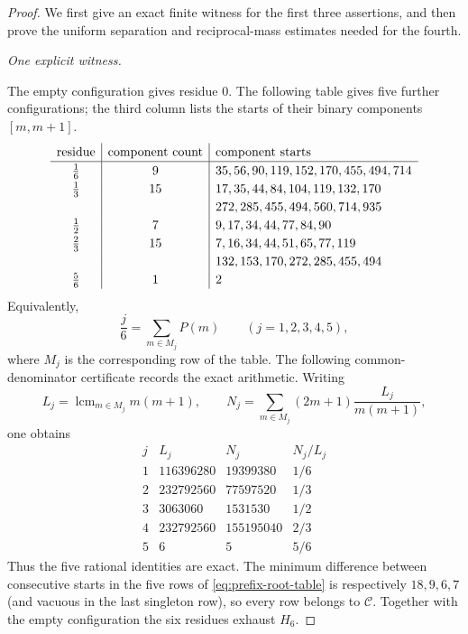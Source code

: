 \begin{proof}
We first give an exact finite witness for the first three assertions, and then prove the uniform separation and reciprocal-mass estimates needed for the fourth.

\smallskip
\noindent\emph{One explicit witness.}

The empty configuration gives residue $0$.  The following table gives five further configurations; the third column lists the starts of their binary components $[m,m+1]$.
\begin{equation}\label{eq:prefix-root-table}
\renewcommand{\arraystretch}{1.2}
\begin{array}{c|c|l}
\text{residue}&\text{component count}&\text{component starts}\\
\hline
\frac16&9&35,56,90,119,152,170,455,494,714\\
\frac13&15&17,35,44,84,104,119,132,170\\
&&272,285,455,494,560,714,935\\
\frac12&7&9,17,34,44,77,84,90\\
\frac23&15&7,16,34,44,51,65,77,119\\
&&132,153,170,272,285,455,494\\
\frac56&1&2
\end{array}
\end{equation}
Equivalently,
\[
\frac j6=\sum_{m\in M_j}P(m)
\qquad(j=1,2,3,4,5),
\]
where $M_j$ is the corresponding row of the table.  The following common-denominator certificate records the exact arithmetic.  Writing
\[
L_j=\operatorname{lcm}_{m\in M_j}m(m+1),
\qquad
N_j=\sum_{m\in M_j}(2m+1)\frac{L_j}{m(m+1)},
\]
one obtains
\begin{equation}\label{eq:prefix-rational-certificate}
\begin{array}{c|r|r|c}
j&L_j&N_j&N_j/L_j\\
\hline
1&116396280&19399380&1/6\\
2&232792560&77597520&1/3\\
3&3063060&1531530&1/2\\
4&232792560&155195040&2/3\\
5&6&5&5/6
\end{array}
\end{equation}
Thus the five rational identities are exact.  The minimum difference between consecutive starts in the five rows of \eqref{eq:prefix-root-table} is respectively $18,9,6,7$ (and vacuous in the last singleton row), so every row belongs to $\mathcal C$.  Together with the empty configuration the six residues exhaust $H_6$.


\end{proof}
